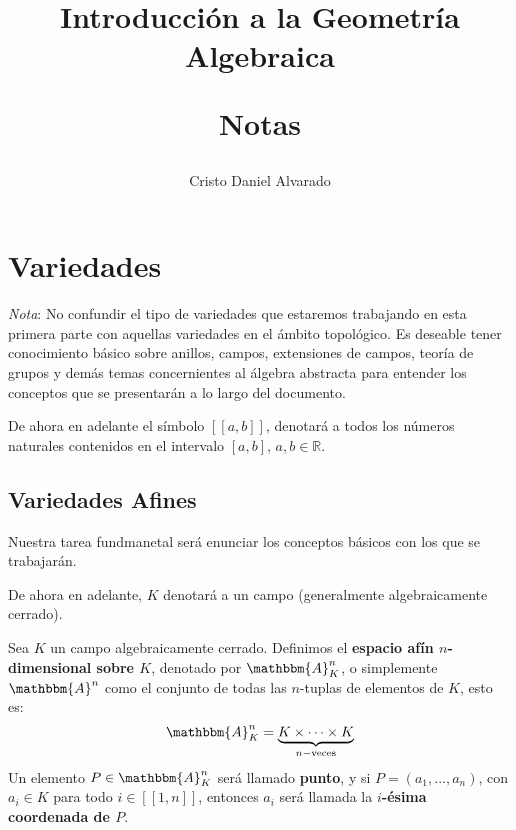 \documentclass[12pt]{report}
\theoremstyle{largebreak}
\newcommand\natint[1]{\ensuremath{\left[\!\left[ #1\right]\!\right]}}
\newcommand{\bbm}[1]{\ensuremath{\mathbbm{#1}}}
\begin{document}
    \setlength{\parskip}{5pt} %
    \setlength{\parindent}{12pt} %
    \title{Introducción a la Geometría Algebraica
    
    Notas}
    \author{Cristo Daniel Alvarado}
    \maketitle

    \tableofcontents %

    
    \chapter{Variedades}
    
    \textit{Nota}: No confundir el tipo de variedades que estaremos trabajando en esta primera parte con aquellas variedades en el ámbito topológico. Es deseable tener conocimiento básico sobre anillos, campos, extensiones de campos, teoría de grupos y demás temas concernientes al álgebra abstracta para entender los conceptos que se presentarán a lo largo del documento.
    
    De ahora en adelante el símbolo $\natint{a,b}$, denotará a todos los números naturales contenidos en el intervalo $[a,b]$, $a,b\in\mathbb{R}$.

    \section{Variedades Afines}
    
    Nuestra tarea fundmanetal será enunciar los conceptos básicos con los que se trabajarán.

    De ahora en adelante, $K$ denotará a un campo (generalmente algebraicamente cerrado).

    \begin{mydef}
        Sea $K$ un campo algebraicamente cerrado. Definimos el \textbf{espacio afín $n$-dimensional sobre $K$}, denotado por $\bbm{A}_K^n$, o simplemente $\bbm{A}^n$ como el conjunto de todas las $n$-tuplas de elementos de $K$, esto es:
        \begin{equation*}
            \bbm{A}_K^n=\underset{n-\textup{veces}}{\underbrace{K\times\cdots\times K}}
        \end{equation*}
        Un elemento $P\in\bbm{A}_K^n$ será llamado \textbf{punto}, y si $P=(a_1,...,a_n)$, con $a_i\in K$ para todo $i\in\natint{1,n}$, entonces $a_i$ será llamada la \textbf{$i$-ésima coordenada de $P$}.
    \end{mydef}
\end{document}
